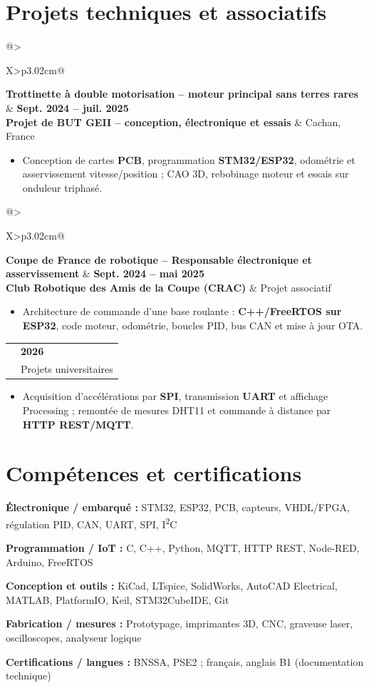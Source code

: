 \documentclass[10pt,a4paper]{article}
\makeatletter
\newcommand{\cventry}[4]{%
  \noindent\begin{tabularx}{\linewidth}{@{}>{\raggedright\arraybackslash}X>{\raggedleft\arraybackslash}p{3.02cm}@{}}
    {\color{vert}\bfseries #1} & {\bfseries\small #2} \\[-1.2pt]
    {\color{bleu}\bfseries #3} & {\small #4}
  \end{tabularx}\vspace{-4pt}\par
}
\newcommand{\itemgap}{\vspace{1.5pt}}
\newcommand{\comp}[2]{\noindent\textbf{#1 :} #2\par}
\makeatother
\begin{document}
\section{Projets techniques et associatifs}
\cventry{Trottinette à double motorisation -- moteur principal sans terres rares}{Sept. 2024 -- juil. 2025}{Projet de BUT GEII -- conception, électronique et essais}{Cachan, France}
\begin{itemize}
  \item Conception de cartes \textbf{PCB}, programmation \textbf{STM32/ESP32}, odométrie et asservissement vitesse/position ; CAO 3D, rebobinage moteur et essais sur onduleur triphasé.
\end{itemize}
\itemgap
\cventry{Coupe de France de robotique -- Responsable électronique et asservissement}{Sept. 2024 -- mai 2025}{Club Robotique des Amis de la Coupe (CRAC)}{Projet associatif}
\begin{itemize}
  \item Architecture de commande d'une base roulante : \textbf{C++/FreeRTOS sur ESP32}, code moteur, odométrie, boucles PID, bus CAN et mise à jour OTA.
\end{itemize}
\itemgap
\cventry{Systèmes embarqués et IoT -- Travaux Polytech Sorbonne}{2026}{\href{https://github.com/Darkzveller/TP2_MCU}{STM32 / ADXL345} \quad | \quad \href{https://github.com/Darkzveller/TP_1_IOT_S7_polytech_sorbonne}{ESP32 / Node-RED}}{Projets universitaires}
\begin{itemize}
  \item Acquisition d'accélérations par \textbf{SPI}, transmission \textbf{UART} et affichage Processing ; remontée de mesures DHT11 et commande à distance par \textbf{HTTP REST/MQTT}.
\end{itemize}

\section{Compétences et certifications}
{\fontsize{9.45}{10.85}\selectfont
\comp{Électronique / embarqué}{STM32, ESP32, PCB, capteurs, VHDL/FPGA, régulation PID, CAN, UART, SPI, I\textsuperscript{2}C}
\comp{Programmation / IoT}{C, C++, Python, MQTT, HTTP REST, Node-RED, Arduino, FreeRTOS}
\comp{Conception et outils}{KiCad, LTspice, SolidWorks, AutoCAD Electrical, MATLAB, PlatformIO, Keil, STM32CubeIDE, Git}
\comp{Fabrication / mesures}{Prototypage, imprimantes 3D, CNC, graveuse laser, oscilloscopes, analyseur logique}
\comp{Certifications / langues}{BNSSA, PSE2 ; français, anglais B1 (documentation technique)}
}
\end{document}
